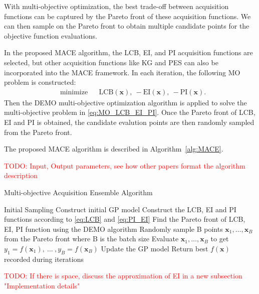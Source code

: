 With multi-objective optimization, the best trade-off between acquisition functions can be captured by the Pareto front of these acquisition functions. We can then sample on the Pareto front to obtain multiple candidate points for the objective function evaluations. 

In the proposed MACE algorithm, the LCB, EI, and PI acquisition functions are selected, but other acquisition functions like KG and PES can also be incorporated into the MACE framework. In each iteration, the following MO problem is constructed:
\begin{equation}
    \label{eq:MO_LCB_EI_PI}
    \begin{aligned}
        & \text{minimize} & & \mathrm{LCB}(\bm{x}),~-\mathrm{EI}(\bm{x}),~-\mathrm{PI}(\bm{x}).
    \end{aligned}
\end{equation}
Then the DEMO multi-objective optimization algorithm is applied to solve the multi-objective problem in \eqref{eq:MO_LCB_EI_PI}. Once the Pareto front of LCB, EI and PI is obtained, the candidate evalution points are then randomly sampled from the Pareto front.


The proposed MACE algorithm is described in Algorithm~\ref{alg:MACE}.

\textcolor{red}{TODO: Input, Output parameters, see how other papers format the algorithm description}
\begin{algorithm}
\caption{Multi-objective Acquisition Ensemble Algorithm}
\label{alg:MACE}
\begin{algorithmic}[1]
\STATE Initial Sampling
\STATE Construct initial GP model
    \STATE Construct the LCB, EI and PI functions according to \eqref{eq:LCB} and \eqref{eq:PI_EI}
    \STATE Find the Pareto front of LCB, EI, PI function using the DEMO algorithm
    \STATE Randomly sample B points $\bm{x}_1, \dots, \bm{x}_B$ from the Pareto front where B is the batch size
    \STATE Evaluate $\bm{x}_1, \dots, \bm{x}_B$ to get $y_1 = f(\bm{x}_1),~\dots~,y_B = f(\bm{x}_B)$
    \STATE Update the GP model
\ENDFOR
\STATE Return best $f(\bm{x})$ recorded during iterations
\end{algorithmic}
\end{algorithm}

\textcolor{red}{TODO: If there is space, discuss the approximation of EI in a new subsection "Implementation details"}
